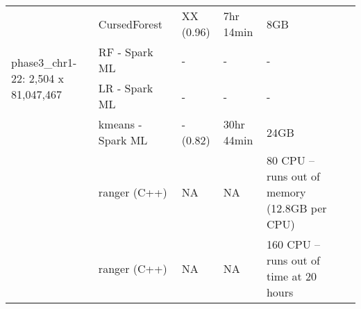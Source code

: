 \documentclass[11pt]{article}
\newcommand{\cursedforest}{{\sc CursedForest}}
\begin{document}
\begin{table}[!ht]
\begin{minipage}{\textwidth}
\begin{tabular}{|l|l|l|l|l|l|p{1cm}|}
\multirow{4}{*}{phase3\_chr1-22: 2,504 x 81,047,467} & \cursedforest\ & XX (0.96) & 7hr 14min & 8GB \\
& RF - Spark ML & - & - & - \\
& LR - Spark ML & - & - & - \\ 
& kmeans - Spark ML  & - (0.82)      & 30hr 44min    & 24GB \\ 
& ranger (C++)       &        NA     &        NA     &            80 CPU -- runs out of memory (12.8GB per CPU) \\
& ranger (C++)       &        NA     &        NA     &            160
                                                        CPU -- runs
                                                        out of time at
                                                        20 hours \\
\hline

\end{tabular}
\end{minipage}
\end{table}
\end{document}
